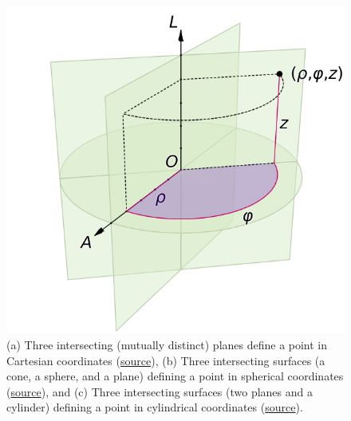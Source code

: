 \documentclass{article}
\theoremstyle{definition}
\begin{document}
\begin{figure}[h!]
	\includegraphics[scale=0.2]{gr-fig-4c.png}
	\caption{(a) Three intersecting (mutually distinct) planes define a point in Cartesian coordinates (\href{https://en.wikipedia.org/wiki/Cartesian_coordinate_system}{source}), (b) Three intersecting surfaces (a cone, a sphere, and a plane) defining a point in spherical coordinates (\href{https://en.wikipedia.org/wiki/Curvilinear_coordinates}{source}), and (c) Three intersecting surfaces (two planes and a cylinder) defining a point in cylindrical coordinates (\href{https://en.wikipedia.org/wiki/Cylindrical_coordinate_system}{source}).}
\end{figure}
\end{document}
